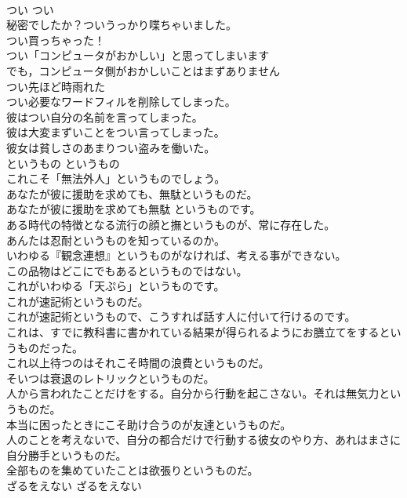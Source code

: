 \documentclass[8pt]{extreport}
\begin{document}
\begin{CJK}{UTF8}{min}
\\	つい	つい	
\\	秘密でしたか？ついうっかり喋ちゃいました。　  
\\	つい買っちゃった！  
\\	つい「コンピュータがおかしい」と思ってしまいます
\\	でも，コンピュータ側がおかしいことはまずありません
\\	つい先ほど時雨れた  
\\	つい必要なワードフィルを削除してしまった。  
\\	彼はつい自分の名前を言ってしまった。   
\\	彼は大変まずいことをつい言ってしまった。   
\\	彼女は貧しさのあまりつい盗みを働いた。   
\\	というもの	というもの	
\\	これこそ「無法外人」というものでしょう。  
\\	あなたが彼に援助を求めても、無駄というものだ。   
\\	あなたが彼に援助を求めても無駄 というものです。   
\\	ある時代の特徴となる流行の顔と撫というものが、常に存在した。   
\\	あんたは忍耐というものを知っているのか。   
\\	いわゆる『観念連想』というものがなければ、考える事ができない。   
\\	この品物はどこにでもあるというものではない。   
\\	これがいわゆる「天ぷら」というものです。  
\\	これが速記術というものだ。   
\\	これが速記術というもので、こうすれば話す人に付いて行けるのです。   
\\	これは、すでに教科書に書かれている結果が得られるようにお膳立てをするというものだった。  
\\	これ以上待つのはそれこそ時間の浪費というものだ。   
\\	そいつは衰退のレトリックというものだ。   
\\	人から言われたことだけをする。自分から行動を起こさない。それは無気力というものだ。  
\\	本当に困ったときにこそ助け合うのが友達というものだ。  
\\	人のことを考えないで、自分の都合だけで行動する彼女のやり方、あれはまさに自分勝手というものだ。  
\\	全部ものを集めていたことは欲張りというものだ。  
\\	ざるをえない	ざるをえない	

\end{CJK}
\end{document}
